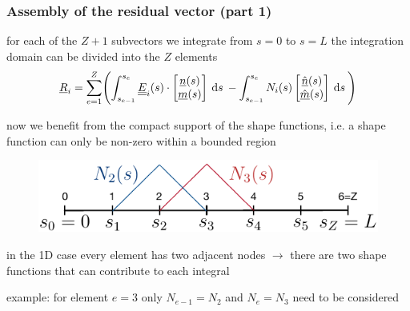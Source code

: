 \begin{frame}
  \frametitle{Assembly of the residual vector (part 1)}

  for each of the $Z+1$ subvectors we integrate from $s=0$ to $s=L$ \newline
  the integration domain can be divided into the $Z$ elements
  \begin{displaymath}
    \underline{R}_i =
    \sum_{e=1}^{Z}
    \Biggl(
    \int_{s_{e-1}}^{s_e}
      \doubleunderline{E}_i(s) \cdot
      \begin{bmatrix}
        \underline{n}(s) \\ \underline{m}(s)
      \end{bmatrix}
    \: \dif s \:
    - \int_{s_{e-1}}^{s_e}
      N_i(s)
      \begin{bmatrix}
        \underline{\hat{n}}(s) \\ \underline{\hat{m}}(s)
      \end{bmatrix}
    \: \dif s \:
    \Biggr)
  \end{displaymath}

  \vspace{0.5em}
  now we benefit from the compact support of the shape functions, \newline
  i.e. a shape function can only be non-zero within a bounded region
  \begin{figure}
    \centering
    \includegraphics[width=14cm, keepaspectratio=true]{sections/cosserat_rods/images/DiscretizationWeakFormShapeFunction}
  \end{figure}
  in the 1D case every element has two adjacent nodes \newline
  $\rightarrow$ there are two shape functions that can contribute to each integral

  \vspace{0.5em}
  example: for element $e=3$ only $N_{e-1}=N_2$ and $N_e=N_3$ need to be considered
\end{frame}

